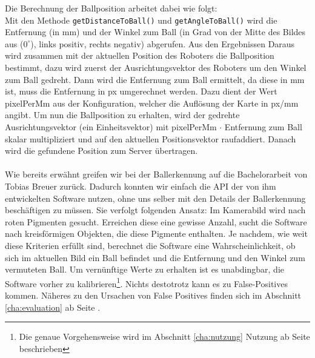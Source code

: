 Die Berechnung der Ballposition arbeitet dabei wie folgt:\\
 Mit den Methode \lstinline|getDistanceToBall()| und
    \lstinline|getAngleToBall()| wird die Entfernung (in mm) und der Winkel
    zum Ball (in Grad von der Mitte des Bildes aus ($0^\circ$), links positiv, rechts
		negativ) abgerufen. 
Aus den Ergebnissen Daraus wird zusammen mit der aktuellen Position des Roboters
    die Ballposition bestimmt, dazu wird zuerst der Ausrichtungsvektor des
		Roboters um den Winkel zum Ball gedreht.
Dann wird die Entfernung zum Ball ermittelt, da diese in mm ist, muss
die Entfernung in px umgerechnet werden. Dazu dient der Wert
pixelPerMm aus der Konfiguration, welcher die Auflösung der Karte in px/mm angibt. Um nun die Ballposition zu
	erhalten, wird der gedrehte Ausrichtungsvektor (ein Einheitsvektor) mit
		pixelPerMm $\cdot$ Entfernung zum Ball skalar multipliziert und auf den aktuellen
		Positionsvektor raufaddiert.
Danach wird die gefundene Position zum Server übertragen.
\\\\
Wie bereits erwähnt greifen wir bei der Ballerkennung auf die
Bachelorarbeit von Tobias Breuer zurück. Dadurch konnten wir einfach
die API der von ihm entwickelten Software nutzen, ohne uns selber mit
den Details der Ballerkennung beschäftigen zu müssen. Sie verfolgt
folgenden Ansatz: Im Kamerabild wird nach roten Pigmenten
gesucht. Erreichen diese eine gewisse Anzahl, sucht die Software nach
kreisförmigen Objekten, die diese Pigmente enthalten. Je nachdem,
wie weit diese Kriterien erfüllt sind, berechnet die Software eine
Wahrscheinlichkeit, ob sich im aktuellen Bild ein Ball befindet und
die Entfernung und den Winkel zum vermuteten Ball. Um vernünftige
Werte zu erhalten ist es unabdingbar, die Software vorher zu
kalibrieren\footnote{Die genaue Vorgehensweise wird im Abschnitt
\ref{cha:nutzung} Nutzung ab Seite \pageref{cha:nutzung} beschrieben}.  Nichts
destotrotz kann es zu False-Positives
kommen. Näheres zu den  Ursachen von
False Positives finden sich im Abschnitt \ref{cha:evaluation} ab Seite \pageref{cha:evaluation}.
